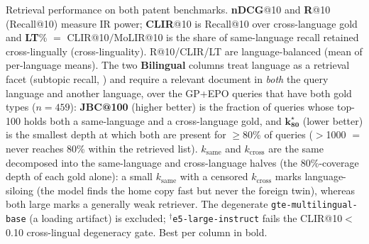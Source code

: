 \begin{table}[t]
\caption{Retrieval performance on both patent benchmarks. \textbf{nDCG}@10 and \textbf{R}@10 (Recall@10) measure IR power; \textbf{CLIR}@10 is Recall@10 over cross-language gold and \textbf{LT}\% $=$ CLIR@10$/$MoLIR@10 is the share of same-language recall retained cross-lingually (cross-linguality). R@10/CLIR/LT are language-balanced (mean of per-language means). The two \textbf{Bilingual} columns treat language as a retrieval facet (subtopic recall, \citealp{zhai2003subtopic}) and require a relevant document in \emph{both} the query language and another language, over the GP+EPO queries that have both gold types ($n{=}459$): \textbf{JBC@100} (higher better) is the fraction of queries whose top-100 holds both a same-language and a cross-language gold, and $\boldsymbol{k^\star_{80}}$ (lower better) is the smallest depth at which both are present for $\geq$80\% of queries ($>$1000 $=$ never reaches 80\% within the retrieved list). $k_{\mathrm{same}}$ and $k_{\mathrm{cross}}$ are the same decomposed into the same-language and cross-language halves (the 80\%-coverage depth of each gold alone): a small $k_{\mathrm{same}}$ with a censored $k_{\mathrm{cross}}$ marks language-siloing (the model finds the home copy fast but never the foreign twin), whereas both large marks a generally weak retriever. The degenerate \texttt{gte-multilingual-base} (a loading artifact) is excluded; $^\dagger$\texttt{e5-large-instruct} fails the CLIR@10$<$0.10 cross-lingual degeneracy gate. Best per column in bold.}
\label{tab:main}
\end{table}
